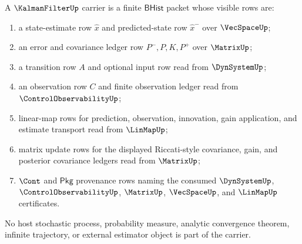 \begin{definition}
\label{def:kalman-filter-carrier}
\label{def:kalmanfilter-bhist-carrier}
A $\KalmanFilterUp$ carrier is a finite $\mathsf{BHist}$ packet whose visible rows are:
\begin{enumerate}
\item a state-estimate row $\widehat{x}$ and predicted-state row $\widehat{x}^{-}$ over $\VecSpaceUp$;
\item an error and covariance ledger row $P^{-},P,K,P^{+}$ over $\MatrixUp$;
\item a transition row $A$ and optional input row read from $\DynSystemUp$;
\item an observation row $C$ and finite observation ledger read from $\ControlObservabilityUp$;
\item linear-map rows for prediction, observation, innovation, gain application, and estimate transport read from $\LinMapUp$;
\item matrix update rows for the displayed Riccati-style covariance, gain, and posterior covariance ledgers read from $\MatrixUp$;
\item $\Cont$ and $\mathsf{Pkg}$ provenance rows naming the consumed $\DynSystemUp$, $\ControlObservabilityUp$, $\MatrixUp$, $\VecSpaceUp$, and $\LinMapUp$ certificates.
\end{enumerate}
No host stochastic process, probability measure, analytic convergence theorem, infinite trajectory, or external estimator object is part of the carrier.
\end{definition}

